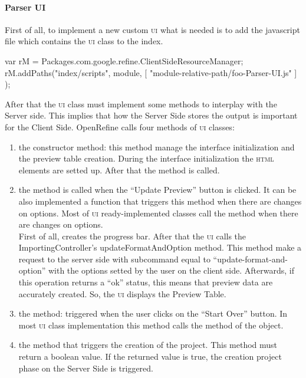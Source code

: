 \paragraph{Parser UI}First of all, to implement a new custom \textsc{ui} what is needed is to add the javascript file which contains the \textsc{ui} class to the index.
\begin{code}
var rM = Packages.com.google.refine.ClientSideResourceManager;
rM.addPaths("index/scripts", module, 
            [ "module-relative-path/foo-Parser-UI.js" ] );
\end{code}
After that the \textsc{ui} class must implement some methods to interplay with the Server side. This implies that how the Server Side stores the output is important for the Client Side. OpenRefine calls four methods of \textsc{ui} classes: 
\begin{enumerate}
	\item the constructor method: this method manage the interface initialization and the preview table creation. During the interface initialization the \textsc{html} elements are setted up. After that the  method is called.
	\begin{code}
Refine.FooParserUI = function(controller, jobID, job, 
       format, config, dataContainerElmt, 
       progressContainerElmt, optionContainerElmt) {
    // initialize interface and variables
    ...
    
    this._updatePreview();
	\end{code}
	\item the  method is called when the ``Update Preview'' button is clicked. It can be also implemented a function that triggers this method when there are changes on options. Most of \textsc{ui} ready-implemented classes call the  method when there are changes on options.\\
	 First of all, creates the progress bar. After that the \textsc{ui} calls the ImportingController's updateFormatAndOption method. This method make a request to the server side with subcommand equal to ``update-format-and-option'' with the options setted by the user on the client side. Afterwards, if this operation returns a ``ok'' status, this means that preview data are accurately created. So, the \textsc{ui} displays the Preview Table. 
	\item the  method: triggered when the user clicks on the ``Start Over'' button. In most \textsc{ui} class implementation this method calls the  method of the  object.
	\item the  method that triggers the creation of the project. This method must return a boolean value. If the returned value is true, the creation project phase on the Server Side is triggered.
\end{enumerate}

